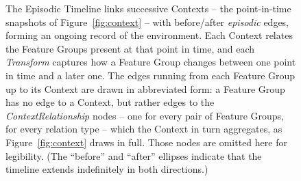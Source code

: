 \documentclass{article}
\begin{document}
\begin{figure}[ht]
{%
  }
  \caption{The Episodic Timeline links successive Contexts -- the point-in-time snapshots of Figure~\ref{fig:context} -- with before/after \emph{episodic} edges, forming an ongoing record of the environment. Each Context relates the Feature Groups present at that point in time, and each \emph{Transform} captures how a Feature Group changes between one point in time and a later one. The edges running from each Feature Group up to its Context are drawn in abbreviated form: a Feature Group has no edge to a Context, but rather edges to the \emph{ContextRelationship} nodes -- one for every pair of Feature Groups, for every relation type -- which the Context in turn aggregates, as Figure~\ref{fig:context} draws in full. Those nodes are omitted here for legibility. (The ``before'' and ``after'' ellipses indicate that the timeline extends indefinitely in both directions.)}
  \label{fig:episodic-timeline}
\end{figure}
\end{document}
